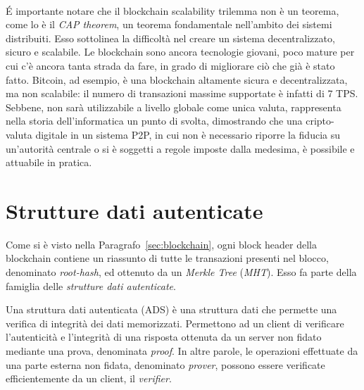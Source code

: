 \paragraph*{}
\'E importante notare che il blockchain scalability trilemma non è un teorema, come lo è il \textit{CAP theorem}, un teorema fondamentale nell'ambito dei sistemi distribuiti. Esso sottolinea la difficoltà nel creare un sistema decentralizzato, sicuro e scalabile. Le blockchain sono ancora tecnologie giovani, poco mature per cui c'è ancora tanta strada da fare, in grado di migliorare ciò che già è stato fatto. Bitcoin, ad esempio, è una blockchain altamente sicura e decentralizzata, ma non scalabile: il numero di transazioni massime supportate è infatti di 7 TPS. Sebbene, non sarà utilizzabile a livello globale come unica valuta, rappresenta nella storia dell'informatica un punto di svolta, dimostrando che una cripto-valuta digitale in un sistema P2P, in cui non è necessario riporre la fiducia su un'autorità centrale o si è soggetti a regole imposte dalla medesima, è possibile e attuabile in pratica.


\section{Strutture dati autenticate}\label{sec:ads}

Come si è visto nella Paragrafo~\ref{sec:blockchain}, ogni block header della blockchain contiene un riassunto di tutte le transazioni presenti nel blocco, denominato \emph{root-hash}, ed ottenuto da un \textit{Merkle Tree} (\textit{MHT}). Esso fa parte della famiglia delle \emph{strutture dati autenticate}.

Una struttura dati autenticata (ADS) è una struttura dati che permette una verifica di integrità dei dati memorizzati. Permettono ad un client di verificare l'autenticità e l'integrità di una risposta ottenuta da un server non fidato mediante una prova, denominata \emph{proof}. In altre parole, le operazioni effettuate da una parte esterna non fidata, denominato \emph{prover}, possono essere verificate efficientemente da un client, il \emph{verifier}.

